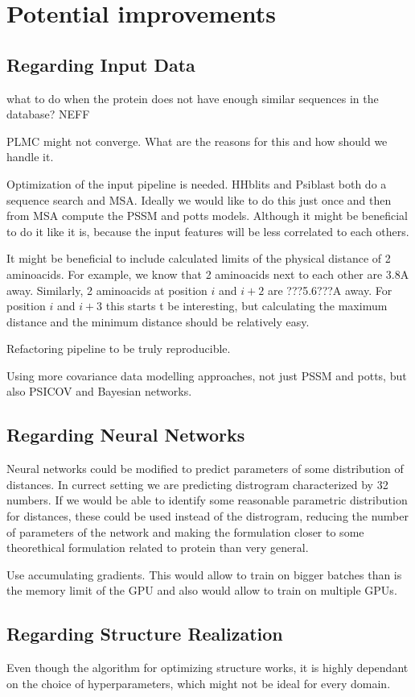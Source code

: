 \section{Potential improvements}

\subsection{Regarding Input Data}
what to do when the protein does not have enough similar sequences in the database?
NEFF

PLMC might not converge. What are the reasons for this and how should we handle it.

Optimization of the input pipeline is needed.
HHblits and Psiblast both do a sequence search and MSA.
Ideally we would like to do this just once and then from MSA compute the PSSM and potts models.
Although it might be beneficial to do it like it is, because the input features will be less correlated to each others.

It might be beneficial to include calculated limits of the physical distance of 2 aminoacids.
For example, we know that 2 aminoacids next to each other are 3.8A away.
Similarly, 2 aminoacids at position $i$ and $i+2$ are ???5.6???A away.
For position $i$ and $i+3$ this starts t be interesting, but calculating the maximum distance and the minimum distance should be relatively easy.

Refactoring pipeline to be truly reproducible.

Using more covariance data modelling approaches, not just PSSM and potts, but also PSICOV and Bayesian networks.

\subsection{Regarding Neural Networks}
Neural networks could be modified to predict parameters of some distribution of distances.
In currect setting we are predicting distrogram characterized by 32 numbers.
If we would be able to identify some reasonable parametric distribution for distances, these could be used instead of the distrogram, reducing the number of parameters of the network and making the formulation closer to some theorethical formulation related to protein than very general.

Use accumulating gradients. This would allow to train on bigger batches than is the memory limit of the GPU and also would allow to train on multiple GPUs.

\subsection{Regarding Structure Realization}

Even though the algorithm for optimizing structure works, it is highly dependant on the choice of hyperparameters, which might not be ideal for every domain. 
